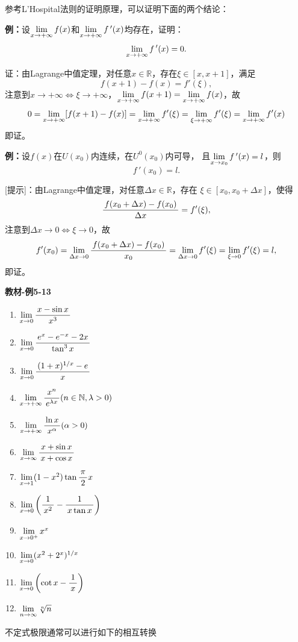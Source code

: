 参考L'Hospital法则的证明原理，可以证明下面的两个结论：

{\bf 例：}设$\lim\limits_{x\to{+\infty}}f(x)$和$\lim\limits_{x\to{+\infty}}f\,'(x)$均存在，证明：
$$\lim\limits_{x\to{+\infty}}f\,'(x)=0.$$

证：由Lagrange中值定理，对任意$x\in\mathbb{R}$，存在$\xi\in[x,x+1]$，满足
$$f(x+1)-f(x)=f'(\xi),$$
注意到$x\to+\infty\Leftrightarrow\xi\to+\infty$，$\lim\limits_{x\to{+\infty}}f(x+1)=
\lim\limits_{x\to{+\infty}}f(x)$，故
$$0=\lim\limits_{x\to{+\infty}}[f(x+1)-f(x)]=\lim\limits_{x\to{+\infty}}f'(\xi)
=\lim\limits_{\xi\to+\infty}f'(\xi)=\lim\limits_{x\to{+\infty}}f'(x)$$
即证。

{\bf 例：}设$f(x)$在$U(x_0)$内连续，在$U^0(x_0)$内可导，
且$\lim\limits_{x\to{x_0}}f\,'(x)=l$，则$$f\,'(x_0)=l.$$

[提示]：由Lagrange中值定理，对任意$\Delta x\in\mathbb{R}$，存在
$\xi\in[x_0,x_0+\Delta x]$，使得
$$\displaystyle\frac{\,{f(x_0+\Delta x)-f(x_0)}\,}{\,{\Delta x}\,}=f'(\xi),$$
注意到$\Delta x\to 0\Leftrightarrow\xi\to0$，故
$$f'(x_0)=\lim\limits_{\Delta x\to 0}\displaystyle\frac{\,{f(x_0+\Delta x)-f(x_0)}\,}{\,{x_0}\,}
=\lim\limits_{\Delta x\to 0}f'(\xi)=\lim\limits_{\xi\to 0}f'(\xi)=l,$$
即证。

{\bf 教材-例5-13}
\begin{enumerate}[(1)]
  \setlength{\itemindent}{1cm}
  \item $\lim\limits_{x\to{0}}\displaystyle\frac{\,{x-\sin x}\,}{\,{x^3}\,}$ 
  \item $\lim\limits_{x\to{0}}\displaystyle\frac{\,{e^x-e^{-x}-2x}\,}{\,{\tan^3x}\,}$ 
  \item $\lim\limits_{x\to{0}}\displaystyle\frac{\,{(1+x)^{1/x}-e}\,}{\,{x}\,}$ 
  \item $\lim\limits_{x\to{+\infty}}\displaystyle\frac{\,{x^n}\,}{\,{e^{\lambda
  x}}\,}(n\in\mathbb{N},\lambda>0)$ 
  \item $\lim\limits_{x\to{+\infty}}\displaystyle\frac{\,{\ln x}\,}{\,{x^\alpha}\,}(\alpha>0)$ 
  \item $\lim\limits_{x\to{\infty}}\displaystyle\frac{\,{x+\sin x}\,}{\,{x+\cos x}\,}$
  \item $\lim\limits_{x\to{1}}(1-x^2)\tan\displaystyle\frac{\,{\pi}\,}{\,{2}\,}x$ 
  \item $\lim\limits_{x\to{0}}\left(\displaystyle\frac{\,{1}\,}{\,{x^2}\,}-\displaystyle\frac{\,{1}\,}{\,{x\tan x}\,}\right)$ 
  \item $\lim\limits_{x\to{0^+}}x^x$
  \item $\lim\limits_{x\to{0}}(x^2+2^x)^{1/x}$ 
  \item $\lim\limits_{x\to{0}}\left(\cot x-\displaystyle\frac{\,{1}\,}{\,{x}\,}\right)$ 
  \item $\lim\limits_{n\to\infty}\sqrt[n]n$
\end{enumerate}

不定式极限通常可以进行如下的相互转换

\begin{center}
\end{center}

